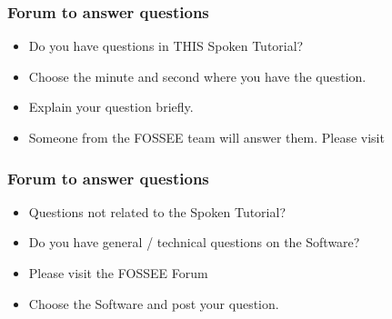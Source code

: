 \documentclass[17pt]{beamer}
\begin{document}
\begin{frame}
\frametitle{Forum to answer questions}
\begin{itemize}
\item Do you have questions in THIS Spoken Tutorial?
\item Choose the minute and second where you have the question.
\item Explain your question briefly.
\item Someone from the FOSSEE team will answer them. Please visit 
\end{itemize}
\begin{center}
{\color{blue}{http://forums.spoken-tutorial.org/}}
 \end{center} 
\end{frame}
\begin{frame}
\frametitle{Forum to answer questions}
\begin{itemize}
\item Questions not related to the Spoken Tutorial?
\item Do you have general / technical questions on the Software?
\item Please visit the FOSSEE Forum
\begin{center}
{\color{blue}{http://forums.fossee.in/}}
 \end{center}
\item Choose the Software and post your question.
\end{itemize}
\end{frame}
\end{document}

